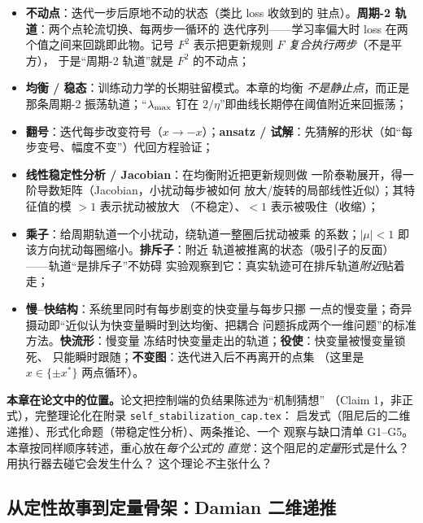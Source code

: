 \begin{notebox}[title={动力系统小词典：本章的专用词汇（第 0 章背景速查 D 组的精简版）}]
\begin{itemize}
  \item \textbf{不动点}：迭代一步后原地不动的状态（类比 loss 收敛到的
        驻点）。\textbf{周期-2 轨道}：两个点轮流切换、每两步一循环的
        迭代序列——学习率偏大时 loss 在两个值之间来回跳即此物。记号
        $F^{2}$ 表示把更新规则 $F$ \emph{复合执行两步}（不是平方），
        于是“周期-2 轨道”就是 $F^{2}$ 的不动点；
  \item \textbf{均衡 / 稳态}：训练动力学的长期驻留模式。本章的均衡
        \emph{不是静止点}，而正是那条周期-2 振荡轨道；“$\lambda_{\max}$ 钉在
        $2/\eta$”即曲线长期停在阈值附近来回振荡；
  \item \textbf{翻号}：迭代每步改变符号（$x\to-x$）；\textbf{ansatz /
        试解}：先猜解的形状（如“每步变号、幅度不变”）代回方程验证；
  \item \textbf{线性稳定性分析 / Jacobian}：在均衡附近把更新规则做
        一阶泰勒展开，得一阶导数矩阵（Jacobian，小扰动每步被如何
        放大/旋转的局部线性近似）；其特征值的模 $>1$ 表示扰动被放大
        （不稳定）、$<1$ 表示被吸住（收缩）；
  \item \textbf{乘子}：给周期轨道一个小扰动，绕轨道一整圈后扰动被乘
        的系数；$|\mu|<1$ 即该方向扰动每圈缩小。\textbf{排斥子}：附近
        轨道被推离的状态（吸引子的反面）——轨道“是排斥子”不妨碍
        实验观察到它：真实轨迹可在排斥轨道\emph{附近}贴着走；
  \item \textbf{慢--快结构}：系统里同时有每步剧变的快变量与每步只挪
        一点的慢变量；奇异摄动即“近似认为快变量瞬时到达均衡、把耦合
        问题拆成两个一维问题”的标准方法。\textbf{快流形}：慢变量
        冻结时快变量走出的轨道；\textbf{役使}：快变量被慢变量锁死、
        只能瞬时跟随；\textbf{不变图}：迭代进入后不再离开的点集
        （这里是 $x\in\{\pm x^{*}\}$ 两点循环）。
\end{itemize}
\end{notebox}

\textbf{本章在论文中的位置。}论文把控制端的负结果陈述为“机制猜想”
（Claim 1，非正式），完整理论化在附录 \texttt{self\_stabilization\_cap.tex}：
启发式（阻尼后的二维递推）、形式化命题（带稳定性分析）、两条推论、一个
观察与缺口清单 G1--G5。本章按同样顺序转述，重心放在\emph{每个公式的
直觉}：这个阻尼的\emph{定量}形式是什么？用执行器去碰它会发生什么？
这个理论\emph{不}主张什么？

\subsection{从定性故事到定量骨架：Damian 二维递推}\label{sec:ch09-damian}

